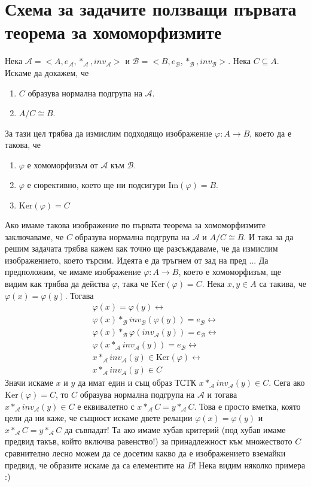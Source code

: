 \documentclass[12pt]{article}
\begin{document}
\section{Схема за задачите ползващи първата теорема за хомоморфизмите}
Нека \(\mathcal{A} = <A, e_\mathcal{A}, *_\mathcal{A}, inv_\mathcal{A}>\)
и \(\mathcal{B} = <B, e_\mathcal{B}, *_\mathcal{B}, inv_\mathcal{B}>\).
Нека \(C \subseteq A\).
Искаме да докажем, че
\begin{enumerate}
    \item \(C\) образува нормална подгрупа на \(\mathcal{A}\).
    \item \(A / C \cong B\).
\end{enumerate}
За тази цел трябва да измислим подходящо изображение
\(\varphi : A \to B\), което да е такова, че
\begin{enumerate}
    \item \(\varphi\) е хомоморфизъм от \(\mathcal{A}\) към \(\mathcal{B}\).
    \item \(\varphi\) е сюрективно, което ще ни подсигури \(\mathrm{Im}(\varphi) = B\).
    \item \(\mathrm{Ker}(\varphi) = C\)
\end{enumerate}
Ако имаме такова изображение по първата теорема за хомоморфизмите заключаваме, че
\(C\) образува нормална подгрупа на \(\mathcal{A}\) и \(A / C \cong B\).
И така за да решим задачата трябва кажем как точно ще разсъждаваме, че да измислим изображението, което търсим. Идеята е да тръгнем от зад на пред ...
Да предположим, че имаме изображение \(\varphi : A \to B\), което е хомоморфизъм,
ще видим как трябва да действа \(\varphi\), така че \(\mathrm{Ker}(\varphi) = C\).
Нека \(x, y \in A\) са такива, че \(\varphi(x) = \varphi(y)\). Тогава
\begin{align*}
    \varphi(x) = \varphi(y) \longleftrightarrow \\
    \varphi(x) *_{\mathcal{B}} inv_{\mathcal{B}}(\varphi(y)) = e_{\mathcal{B}} \longleftrightarrow \\
    \varphi(x) *_{\mathcal{B}} \varphi(inv_{\mathcal{A}}(y)) = e_{\mathcal{B}} \longleftrightarrow \\
    \varphi(x *_{\mathcal{A}} inv_{\mathcal{A}}(y)) = e_{\mathcal{B}} \longleftrightarrow \\
    x *_{\mathcal{A}} inv_{\mathcal{A}}(y) \in \mathrm{Ker}(\varphi) \longleftrightarrow \\
    x *_{\mathcal{A}} inv_{\mathcal{A}}(y) \in C
\end{align*}
Значи искаме \(x\) и \(y\) да имат един и същ образ ТСТК \(x *_{\mathcal{A}} inv_{\mathcal{A}}(y) \in C\). Сега ако \(\mathrm{Ker}(\varphi) = C\), то \(C\) образува нормална подгрупа на \(\mathcal{A}\) и тогава \(x *_{\mathcal{A}} inv_{\mathcal{A}}(y) \in C\) е еквивалетно с \(x *_{\mathcal{A}} C = y *_{\mathcal{A}} C\). Това е просто вметка,
която цели да ни каже, че същност искаме двете релации \(\varphi(x) = \varphi(y)\) и \(x *_{\mathcal{A}} C = y *_{\mathcal{A}} C\) да съвпадат!
Та ако имаме хубав критерий (под хубав имаме предвид такъв, който включва равенство!) за принадлежност към множеството \(C\) сравнително лесно можем да се досетим какво да е изображението вземайки предвид, че образите искаме да са елементите на \(B\)! Нека видим няколко примера :)
\end{document}
